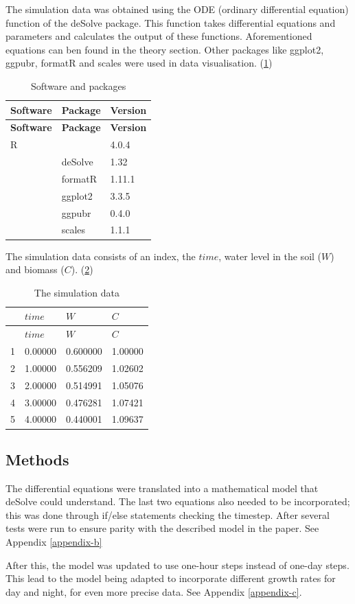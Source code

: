 \documentclass[
]{article}
\begin{document}
The simulation data was obtained using the ODE (ordinary differential
equation) function of the deSolve package. This function takes
differential equations and parameters and calculates the output of these
functions. Aforementioned equations can ben found in the theory section.
Other packages like ggplot2, ggpubr, formatR and scales were used in
data visualisation. (\ref{tab:tab2})

\begin{longtable}[]{@{}lll@{}}
\caption{Software and packages \label{tab:tab2}}\tabularnewline
\toprule
\textbf{Software} & \textbf{Package} & \textbf{Version}\tabularnewline
\midrule
\endfirsthead
\toprule
\textbf{Software} & \textbf{Package} & \textbf{Version}\tabularnewline
\midrule
\endhead
R & & 4.0.4\tabularnewline
& deSolve & 1.32\tabularnewline
& formatR & 1.11.1\tabularnewline
& ggplot2 & 3.3.5\tabularnewline
& ggpubr & 0.4.0\tabularnewline
& scales & 1.1.1\tabularnewline
\bottomrule
\end{longtable}

The simulation data consists of an index, the \(time\), water level in
the soil (\(W\)) and biomass (\(C\)). (\ref{tab:tab3})

\begin{longtable}[]{@{}llll@{}}
\caption{The simulation data \label{tab:tab3}}\tabularnewline
\toprule
& \textbf{\(time\)} & \textbf{\(W\)} & \textbf{\(C\)}\tabularnewline
\midrule
\endfirsthead
\toprule
& \textbf{\(time\)} & \textbf{\(W\)} & \textbf{\(C\)}\tabularnewline
\midrule
\endhead
1 & 0.00000 & 0.600000 & 1.00000\tabularnewline
2 & 1.00000 & 0.556209 & 1.02602\tabularnewline
3 & 2.00000 & 0.514991 & 1.05076\tabularnewline
4 & 3.00000 & 0.476281 & 1.07421\tabularnewline
5 & 4.00000 & 0.440001 & 1.09637\tabularnewline
\bottomrule
\end{longtable}

\hypertarget{methods}{%
\subsection{Methods}\label{methods}}

The differential equations were translated into a mathematical model
that deSolve could understand. The last two equations also needed to be
incorporated; this was done through if/else statements checking the
timestep. After several tests were run to ensure parity with the
described model in the paper. See Appendix \ref{appendix-b}

After this, the model was updated to use one-hour steps instead of
one-day steps. This lead to the model being adapted to incorporate
different growth rates for day and night, for even more precise data.
See Appendix \ref{appendix-c}.
\end{document}
